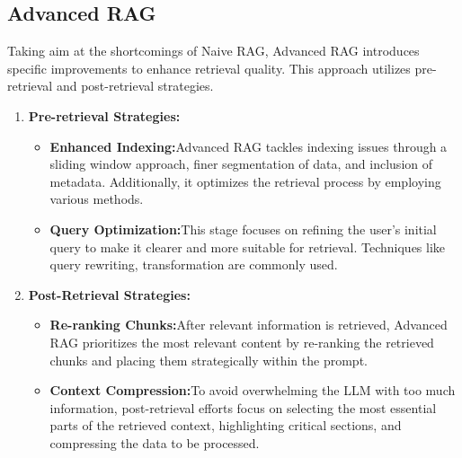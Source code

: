 \subsection{Advanced RAG}
Taking aim at the shortcomings of Naive RAG, Advanced RAG introduces specific improvements to enhance retrieval quality. This approach utilizes pre-retrieval and post-retrieval strategies.
\begin{enumerate}
\item \textbf{Pre-retrieval Strategies:}
\begin{itemize}
	\item\textbf{Enhanced Indexing:}Advanced RAG tackles indexing issues through a sliding window approach, finer segmentation of data, and inclusion of metadata. Additionally, it optimizes the retrieval process by employing various methods.
	\item \textbf{Query Optimization:}This stage focuses on refining the user's initial query to make it clearer and more suitable for retrieval. Techniques like query rewriting, transformation are commonly used.
\end{itemize}
\item \textbf{Post-Retrieval Strategies:}
\begin{itemize}
	\item \textbf{Re-ranking Chunks:}After relevant information is retrieved, Advanced RAG prioritizes the most relevant content by re-ranking the retrieved chunks and placing them strategically within the prompt.
	\item \textbf{Context Compression:}To avoid overwhelming the LLM with too much information, post-retrieval efforts focus on selecting the most essential parts of the retrieved context, highlighting critical sections, and compressing the data to be processed.
\end{itemize}
\end{enumerate}
